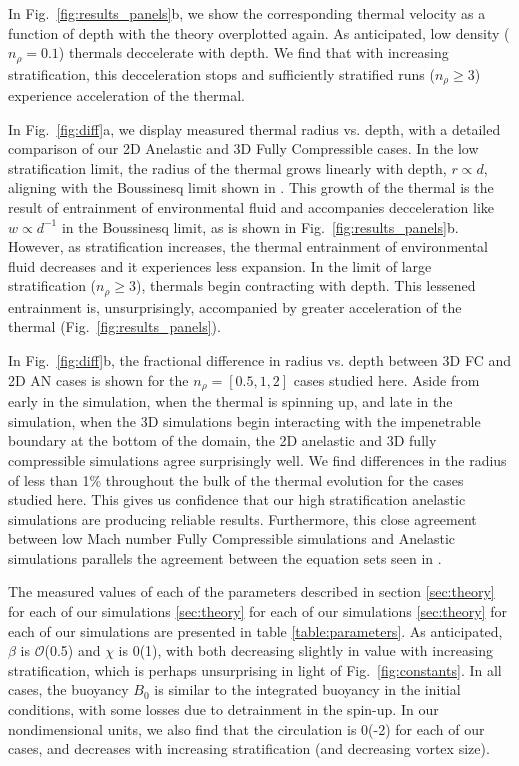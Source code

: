 \documentclass[twocolumn, amsmath, amsfonts, amssymb, trackchanges]{aastex62}
\begin{document}
In Fig.~\ref{fig:results_panels}b, we show the corresponding thermal velocity as a function of depth with the theory overplotted again.
As anticipated, low density ($n_\rho = 0.1$) thermals deccelerate with depth.
We find that with increasing stratification, this decceleration stops and sufficiently stratified runs ($n_\rho \geq 3$) experience acceleration of the thermal.

In Fig.~\ref{fig:diff}a, we display measured thermal radius vs. depth, with a detailed comparison of our 2D Anelastic and 3D Fully Compressible cases. 
In the low stratification limit, the radius of the thermal grows linearly with depth, $r \propto d$, aligning with the Boussinesq limit shown in \citet{lecoanet&jeevanjee2018}.
This growth of the thermal is the result of entrainment of environmental fluid and accompanies decceleration like $w \propto d^{-1}$ in the Boussinesq limit, as is shown in Fig.~\ref{fig:results_panels}b.
However, as stratification increases, the thermal entrainment of environmental fluid decreases and it experiences less expansion.
In the limit of large stratification ($n_\rho \geq 3$), thermals begin contracting with depth.
This lessened entrainment is, unsurprisingly, accompanied by greater acceleration of the thermal (Fig.~\ref{fig:results_panels}).

In Fig.~\ref{fig:diff}b, the fractional difference in radius vs. depth between 3D FC and 2D AN cases is shown for the $n_\rho = [0.5, 1, 2]$ cases studied here. 
Aside from early in the simulation, when the thermal is spinning up, and late in the simulation, when the 3D simulations begin interacting with the impenetrable boundary at the bottom of the domain, the 2D anelastic and 3D fully compressible simulations agree surprisingly well.
We find differences in the radius of less than 1\% throughout the bulk of the thermal evolution for the cases studied here.
This gives us confidence that our high stratification anelastic simulations are producing reliable results.
Furthermore, this close agreement between low Mach number Fully Compressible simulations and Anelastic simulations parallels the agreement between the equation sets seen in \citet{lecoanet&all2014}.

The measured values of each of the parameters described in section \ref{sec:theory} for each of our simulations  \ref{sec:theory} for each of our simulations  \ref{sec:theory} for each of our simulations are presented in table \ref{table:parameters}.
As anticipated, $\beta$ is $\mathcal{O}$(0.5) and $\chi$ is $\mathcal{0}$(1), with both decreasing slightly in value with increasing stratification, which is perhaps unsurprising in light of Fig.~\ref{fig:constants}.
In all cases, the buoyancy $B_0$ is similar to the integrated buoyancy in the initial conditions, with some losses due to detrainment in the spin-up.
In our nondimensional units, we also find that the circulation is $\mathcal{0}$(-2) for each of our cases, and decreases with increasing stratification (and decreasing vortex size).
\end{document}
